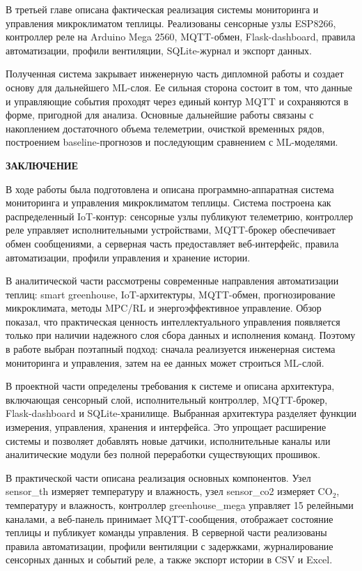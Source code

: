 \documentclass[a4paper,14pt]{extarticle}
\newcommand{\VkrStructuralSection}[1]{%
  \FloatBarrier
  \clearpage
  \phantomsection
  \addcontentsline{toc}{section}{#1}%
  \begin{center}\bfseries #1\end{center}%
  \par\nopagebreak\vspace{12pt}%
}
\renewcommand{\texttt}[1]{\textnormal{#1}}
\begin{document}
В третьей главе описана фактическая реализация системы мониторинга и
управления микроклиматом теплицы. Реализованы сенсорные узлы ESP8266,
контроллер реле на Arduino Mega 2560, MQTT-обмен, Flask-dashboard,
правила автоматизации, профили вентиляции, SQLite-журнал и экспорт
данных.

Полученная система закрывает инженерную часть дипломной работы и создает
основу для дальнейшего ML-слоя. Ее сильная сторона состоит в том, что
данные и управляющие события проходят через единый контур MQTT и
сохраняются в форме, пригодной для анализа. Основные дальнейшие работы
связаны с накоплением достаточного объема телеметрии, очисткой временных
рядов, построением baseline-прогнозов и последующим сравнением с
ML-моделями.

\VkrStructuralSection{ЗАКЛЮЧЕНИЕ}\label{ux437ux430ux43aux43bux44eux447ux435ux43dux438ux435}

В ходе работы была подготовлена и описана программно-аппаратная система
мониторинга и управления микроклиматом теплицы. Система построена как
распределенный IoT-контур: сенсорные узлы публикуют телеметрию,
контроллер реле управляет исполнительными устройствами, MQTT-брокер
обеспечивает обмен сообщениями, а серверная часть предоставляет
веб-интерфейс, правила автоматизации, профили управления и хранение
истории.

В аналитической части рассмотрены современные направления автоматизации
теплиц: smart greenhouse, IoT-архитектуры, MQTT-обмен, прогнозирование
микроклимата, методы MPC/RL и энергоэффективное управление. Обзор
показал, что практическая ценность интеллектуального управления
появляется только при наличии надежного слоя сбора данных и исполнения
команд. Поэтому в работе выбран поэтапный подход: сначала реализуется
инженерная система мониторинга и управления, затем на ее данных может
строиться ML-слой.

В проектной части определены требования к системе и описана архитектура,
включающая сенсорный слой, исполнительный контроллер, MQTT-брокер,
Flask-dashboard и SQLite-хранилище. Выбранная архитектура разделяет
функции измерения, управления, хранения и интерфейса. Это упрощает
расширение системы и позволяет добавлять новые датчики, исполнительные
каналы или аналитические модули без полной переработки существующих
прошивок.

В практической части описана реализация основных компонентов. Узел
\texttt{sensor\_th} измеряет температуру и влажность, узел
\texttt{sensor\_co2} измеряет CO\(_2\), температуру и влажность,
контроллер \texttt{greenhouse\_mega} управляет 15 релейными каналами, а
веб-панель принимает MQTT-сообщения, отображает состояние теплицы и
публикует команды управления. В серверной части реализованы правила
автоматизации, профили вентиляции с задержками, журналирование сенсорных
данных и событий реле, а также экспорт истории в CSV и Excel.
\end{document}
